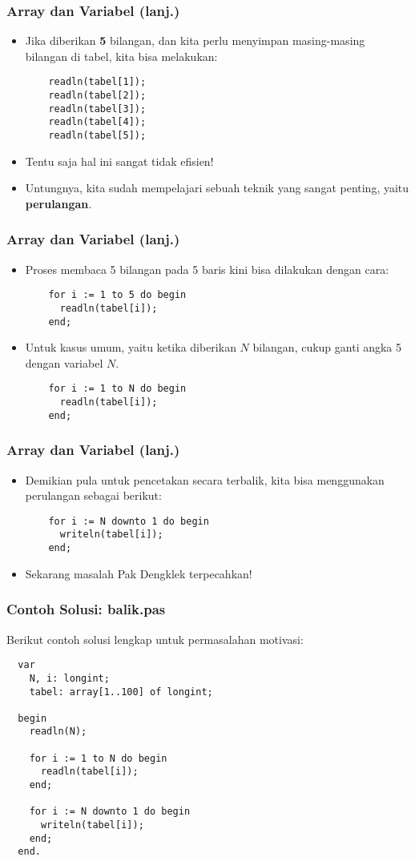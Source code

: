 \begin{frame}[fragile]
\frametitle{Array dan Variabel (lanj.)}
\begin{itemize}
  \item Jika diberikan \textbf{5} bilangan, dan kita perlu menyimpan masing-masing bilangan di tabel, kita bisa melakukan:
  \begin{lstlisting}
    readln(tabel[1]);
    readln(tabel[2]);
    readln(tabel[3]);
    readln(tabel[4]);
    readln(tabel[5]);
  \end{lstlisting}
  \item Tentu saja hal ini sangat tidak efisien!
  \item Untungnya, kita sudah mempelajari sebuah teknik yang sangat penting, yaitu \textbf{perulangan}.
\end{itemize}
\end{frame}

\begin{frame}[fragile]
\frametitle{Array dan Variabel (lanj.)}
\begin{itemize}
  \item Proses membaca 5 bilangan pada 5 baris kini bisa dilakukan dengan cara:
  \begin{lstlisting}
    for i := 1 to 5 do begin
      readln(tabel[i]);
    end;
  \end{lstlisting}
  \item Untuk kasus umum, yaitu ketika diberikan $N$ bilangan, cukup ganti angka 5 dengan variabel $N$.
  \begin{lstlisting}
    for i := 1 to N do begin
      readln(tabel[i]);
    end;
  \end{lstlisting}
\end{itemize}
\end{frame}

\begin{frame}[fragile]
\frametitle{Array dan Variabel (lanj.)}
\begin{itemize}
  \item Demikian pula untuk pencetakan secara terbalik, kita bisa menggunakan perulangan sebagai berikut:
  \begin{lstlisting}
    for i := N downto 1 do begin
      writeln(tabel[i]);
    end;
  \end{lstlisting}
  \item Sekarang masalah Pak Dengklek terpecahkan!
\end{itemize}
\end{frame}

\begin{frame}[fragile]
\frametitle{Contoh Solusi: balik.pas}
Berikut contoh solusi lengkap untuk permasalahan motivasi:
\begin{lstlisting}
  var
    N, i: longint;
    tabel: array[1..100] of longint;

  begin
    readln(N);

    for i := 1 to N do begin
      readln(tabel[i]);
    end;

    for i := N downto 1 do begin
      writeln(tabel[i]);
    end;
  end.
\end{lstlisting}
\end{frame}


